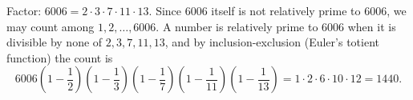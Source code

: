 Factor: $6006=2\cdot3\cdot7\cdot11\cdot13$. Since $6006$ itself is not relatively prime to $6006$, we may count among $1,2,\dots,6006$. A number is relatively prime to $6006$ when it is divisible by none of $2,3,7,11,13$, and by inclusion-exclusion (Euler's totient function) the count is
\[6006\left(1-\dfrac{1}{2}\right)\left(1-\dfrac{1}{3}\right)\left(1-\dfrac{1}{7}\right)\left(1-\dfrac{1}{11}\right)\left(1-\dfrac{1}{13}\right)=1\cdot2\cdot6\cdot10\cdot12=\boxed{1440}.\]
